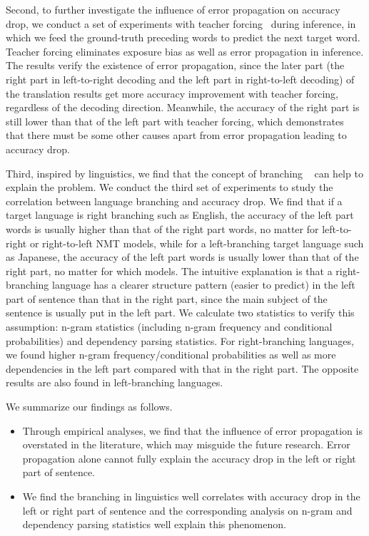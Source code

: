 \documentclass[11pt,a4paper]{article}
\begin{document}
Second, to further investigate the influence of error propagation on accuracy drop, we conduct a set of experiments with teacher forcing~\cite{DBLP:journals/neco/WilliamsZ89} during inference, in which we feed the ground-truth preceding words to predict the next target word. Teacher forcing eliminates exposure bias as well as error propagation in inference. The results verify the existence of error propagation, since the later part (the right part in left-to-right decoding and the left part in right-to-left decoding) of the translation results get more accuracy improvement with teacher forcing, regardless of the decoding direction. Meanwhile, the accuracy of the right part is still lower than that of the left part with teacher forcing, which demonstrates that there must be some other causes apart from error propagation leading to accuracy drop.

Third, inspired by linguistics, we find that the concept of branching ~\cite{berg2011structure,payne2006exploring} can help to explain the problem. We conduct the third set of experiments to study the correlation between language branching and accuracy drop.
We find that if a target language is right branching such as English, the accuracy of the left part words is usually higher than that of the right part words, no matter for left-to-right or right-to-left NMT models, while for a left-branching target language such as Japanese, the accuracy of the left part words is usually lower than that of the right part, no matter for which models.
The intuitive explanation is that a right-branching language has a clearer structure pattern (easier to predict) in the left part of sentence than that in the right part, since the main subject of the sentence is usually put in the left part. We calculate two statistics to verify this assumption: n-gram statistics (including n-gram frequency and conditional probabilities) and dependency parsing statistics. For right-branching languages, we found higher n-gram frequency/conditional probabilities as well as more dependencies in the left part compared with that in the right part. The opposite results are also found in left-branching languages.

We summarize our findings as follows.

\begin{itemize}
\item Through empirical analyses, we find that the influence of error propagation is overstated in the literature, which may misguide the future research. Error propagation alone cannot fully explain the accuracy drop in the left or right part of sentence.
\item We find the branching in linguistics well correlates with accuracy drop in the left or right part of sentence and the corresponding analysis on n-gram and dependency parsing statistics well explain this phenomenon.
\end{itemize}
\end{document}

